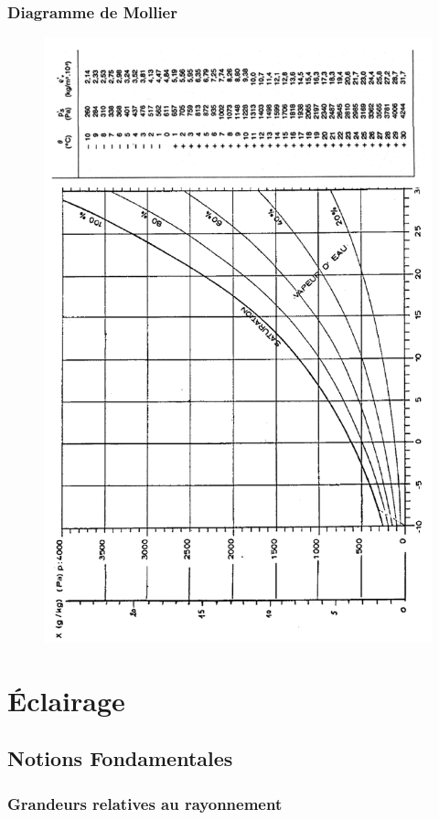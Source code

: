 \documentclass[11pt]{report}
\begin{document}
\section{Diagramme de Mollier}
\begin{figure}[!h]
\centering
\includegraphics[width=0.8\linewidth]{tot}
\end{figure}








\part{Éclairage}
\chapter{Notions Fondamentales}
\section{Grandeurs relatives au rayonnement}
\end{document}
